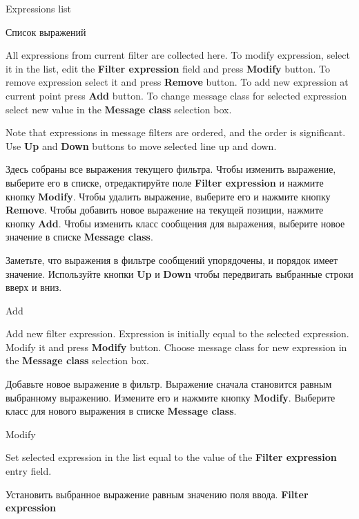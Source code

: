 \begin{popup}
\ifenglish
\caption{Expressions list}
\else
\caption{Список выражений}
\fi
{}

\ifenglish
All expressions from current filter are collected here. To modify expression,
select it in the list, edit the {\bf Filter expression} field and press {\bf Modify}
button. To remove expression select it and press {\bf Remove} button. To add new
expression at current point press {\bf Add} button. To change message class for selected
expression select new value in the {\bf Message class} selection box.

Note that expressions in message filters are ordered, and the order is significant.
Use {\bf Up} and {\bf Down} buttons to move selected line up and down.

\else
Здесь собраны все выражения текущего фильтра. Чтобы изменить выражение, выберите 
его в списке, отредактируйте поле {\bf Filter expression} и нажмите кнопку {\bf Modify}.
Чтобы удалить выражение, выберите его и нажмите кнопку {\bf Remove}. Чтобы добавить
новое выражение на текущей позиции, нажмите кнопку {\bf Add}. Чтобы изменить 
класс сообщения для выражения, выберите новое значение в списке {\bf Message class}.

Заметьте, что выражения в фильтре сообщений упорядочены, и порядок имеет значение. 
Используйте кнопки {\bf Up} и {\bf Down} чтобы передвигать выбранные строки вверх и 
вниз.
\fi
\end{popup}

\begin{popup}
\caption{Add}

\ifenglish
Add new filter expression. Expression is initially equal to the selected
expression. Modify it and press {\bf Modify} button. Choose message class for new
expression in the {\bf Message class} selection box.

\else
Добавьте новое выражение в фильтр. Выражение сначала становится равным 
выбранному выражению. Измените его и нажмите кнопку {\bf Modify}. Выберите класс
для нового выражения в списке {\bf Message class}.
\fi
\end{popup}

\begin{popup}
\caption{Modify}

\ifenglish
Set selected expression in the list equal to the value of the
{\bf Filter expression} entry field.

\else
Установить выбранное выражение равным значению поля ввода. 
{\bf Filter expression}
\fi
\end{popup}

